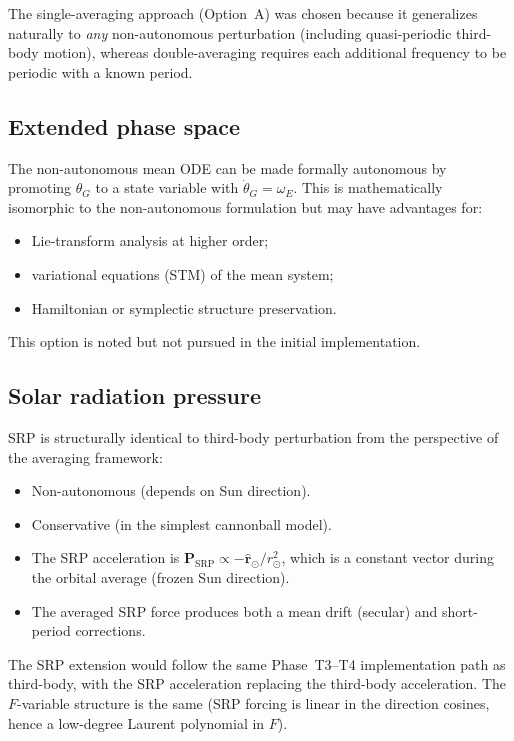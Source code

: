 \documentclass[11pt]{article}
\begin{document}
The single-averaging approach (Option~A) was chosen because it generalizes
naturally to \emph{any} non-autonomous perturbation (including
quasi-periodic third-body motion), whereas double-averaging requires each
additional frequency to be periodic with a known period.

\subsection{Extended phase space}

The non-autonomous mean ODE can be made formally autonomous by promoting
$\theta_G$ to a state variable with $\dot\theta_G = \omega_E$. This is
mathematically isomorphic to the non-autonomous formulation but may have
advantages for:
\begin{itemize}
\item Lie-transform analysis at higher order;
\item variational equations (STM) of the mean system;
\item Hamiltonian or symplectic structure preservation.
\end{itemize}

This option is noted but not pursued in the initial implementation.

\subsection{Solar radiation pressure}

SRP is structurally identical to third-body perturbation from the
perspective of the averaging framework:
\begin{itemize}
\item Non-autonomous (depends on Sun direction).
\item Conservative (in the simplest cannonball model).
\item The SRP acceleration is $\bm P_{\mathrm{SRP}} \propto
-\hat{\bm r}_\odot / r_\odot^2$, which is a constant vector during
the orbital average (frozen Sun direction).
\item The averaged SRP force produces both a mean drift (secular) and
short-period corrections.
\end{itemize}

The SRP extension would follow the same Phase~T3--T4 implementation path
as third-body, with the SRP acceleration replacing the third-body
acceleration. The $F$-variable structure is the same (SRP forcing is
linear in the direction cosines, hence a low-degree Laurent polynomial
in $F$).
\end{document}

